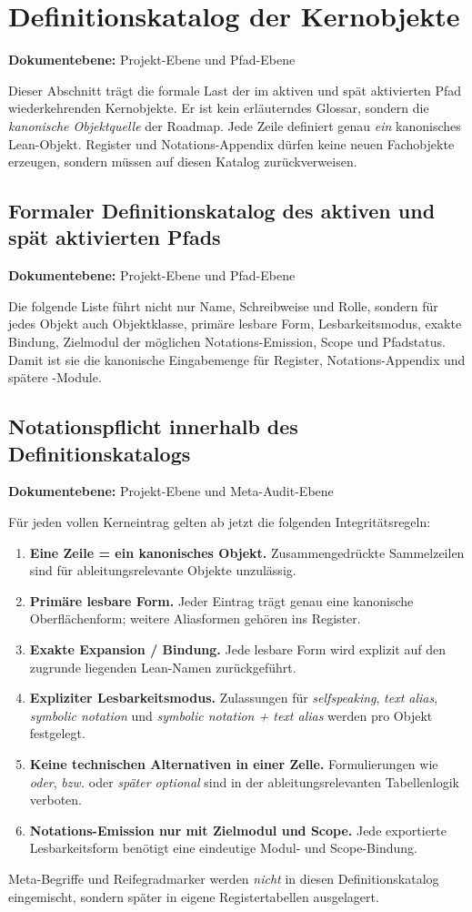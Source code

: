 \documentclass[11pt,a4paper]{article}
\let\oldpath\path
\renewcommand{\path}[1]{\oldpath{#1}}
\newcommand{\doclevel}[1]{\par\small\noindent\textbf{Dokumentebene:} #1\par\normalsize\medskip}
\begin{document}
\newpage
\section{Definitionskatalog der Kernobjekte}
\doclevel{Projekt-Ebene und Pfad-Ebene}
\label{sec:definitions}
Dieser Abschnitt trägt die formale Last der im aktiven und spät aktivierten Pfad wiederkehrenden
Kernobjekte. Er ist kein erläuterndes Glossar, sondern die \emph{kanonische Objektquelle} der Roadmap.
Jede Zeile definiert genau \emph{ein} kanonisches Lean-Objekt. Register und Notations-Appendix dürfen
keine neuen Fachobjekte erzeugen, sondern müssen auf diesen Katalog zurückverweisen.

\subsection{Formaler Definitionskatalog des aktiven und spät aktivierten Pfads}
\doclevel{Projekt-Ebene und Pfad-Ebene}
Die folgende Liste führt nicht nur Name, Schreibweise und Rolle, sondern für jedes Objekt auch
Objektklasse, primäre lesbare Form, Lesbarkeitsmodus, exakte Bindung, Zielmodul der möglichen
Notations-Emission, Scope und Pfadstatus. Damit ist sie die kanonische Eingabemenge für Register,
Notations-Appendix und spätere -Module.

\subsection{Notationspflicht innerhalb des Definitionskatalogs}
\doclevel{Projekt-Ebene und Meta-Audit-Ebene}
Für jeden vollen Kerneintrag gelten ab jetzt die folgenden Integritätsregeln:
\begin{enumerate}
\item \textbf{Eine Zeile = ein kanonisches Objekt.} Zusammengedrückte Sammelzeilen sind für ableitungsrelevante Objekte unzulässig.
\item \textbf{Primäre lesbare Form.} Jeder Eintrag trägt genau eine kanonische Oberflächenform; weitere Aliasformen gehören ins Register.
\item \textbf{Exakte Expansion / Bindung.} Jede lesbare Form wird explizit auf den zugrunde liegenden Lean-Namen zurückgeführt.
\item \textbf{Expliziter Lesbarkeitsmodus.} Zulassungen für \emph{selfspeaking}, \emph{text alias}, \emph{symbolic notation} und \emph{symbolic notation + text alias} werden pro Objekt festgelegt.
\item \textbf{Keine technischen Alternativen in einer Zelle.} Formulierungen wie \emph{oder}, \emph{bzw.} oder \emph{später optional} sind in der ableitungsrelevanten Tabellenlogik verboten.
\item \textbf{Notations-Emission nur mit Zielmodul und Scope.} Jede exportierte Lesbarkeitsform benötigt eine eindeutige Modul- und Scope-Bindung.
\end{enumerate}
Meta-Begriffe und Reifegradmarker werden \emph{nicht} in diesen Definitionskatalog eingemischt, sondern später in eigene Registertabellen ausgelagert.
\end{document}
